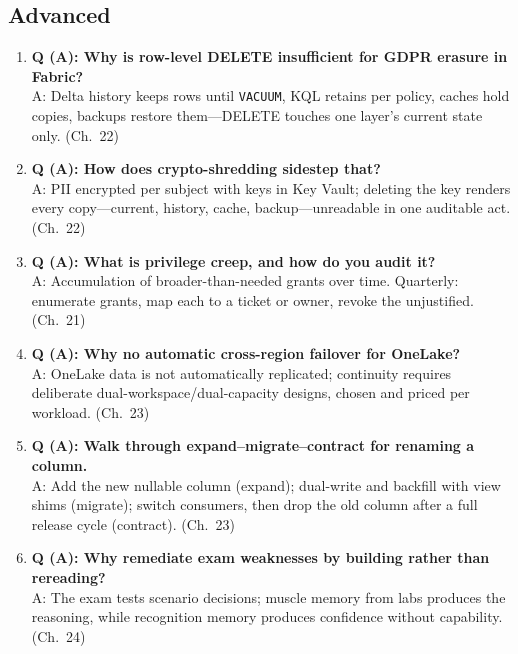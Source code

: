 \subsection*{Advanced}
\begin{enumerate}
    \item \textbf{Q (A): Why is row-level DELETE insufficient for GDPR erasure in Fabric?}\\
    A: Delta history keeps rows until \texttt{VACUUM}, KQL retains per policy, caches hold
    copies, backups restore them---DELETE touches one layer's current state only. (Ch.~22)
    \item \textbf{Q (A): How does crypto-shredding sidestep that?}\\
    A: PII encrypted per subject with keys in Key Vault; deleting the key renders every
    copy---current, history, cache, backup---unreadable in one auditable act. (Ch.~22)
    \item \textbf{Q (A): What is privilege creep, and how do you audit it?}\\
    A: Accumulation of broader-than-needed grants over time. Quarterly: enumerate grants, map
    each to a ticket or owner, revoke the unjustified. (Ch.~21)
    \item \textbf{Q (A): Why no automatic cross-region failover for OneLake?}\\
    A: OneLake data is not automatically replicated; continuity requires deliberate
    dual-workspace/dual-capacity designs, chosen and priced per workload. (Ch.~23)
    \item \textbf{Q (A): Walk through expand--migrate--contract for renaming a column.}\\
    A: Add the new nullable column (expand); dual-write and backfill with view shims (migrate);
    switch consumers, then drop the old column after a full release cycle (contract). (Ch.~23)
    \item \textbf{Q (A): Why remediate exam weaknesses by building rather than rereading?}\\
    A: The exam tests scenario decisions; muscle memory from labs produces the reasoning, while
    recognition memory produces confidence without capability. (Ch.~24)
\end{enumerate}

